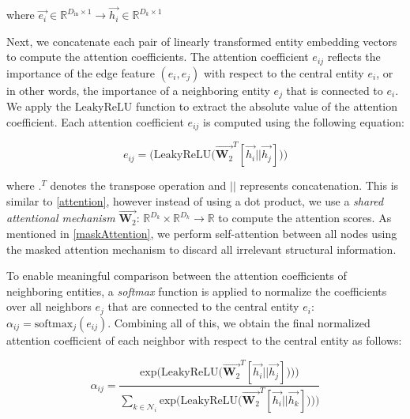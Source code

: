 where $\overrightarrow{e_i} \in \mathbb{R}^{D_{\text{in}} \times 1}
\xrightarrow{} \overrightarrow{h_i} \in \mathbb{R}^{D_k \times 1}$


Next, we concatenate each pair of linearly transformed entity embedding vectors to compute the attention coefficients. The attention coefficient $e_{ij}$ reflects the importance of the edge feature $(e_i, e_j)$ with respect to the central entity $e_i$, or in other words, the importance of a neighboring entity $e_j$ that is connected to $e_i$. We apply the $\text{LeakyReLU}$ function to extract the absolute value of the attention coefficient. Each attention coefficient $e_{ij}$ is computed using the following equation:

\begin{equation}
	e_{ij} = \Big( \text{LeakyReLU} \Big( \overrightarrow{\mathbf{W}_{2}}^{T} [\overrightarrow{h_i} || \overrightarrow{h_j}]\Big) \Big)
\end{equation}

where ${.}^{T}$ denotes the transpose operation and $||$ represents concatenation. This is similar to \ref{attention}, however instead of using a dot product, we use a \textit{shared attentional mechanism} $\overrightarrow{\mathbf{W}_2}$: $\mathbb{R}^{D_k} \times \mathbb{R}^{D_k} \rightarrow \mathbb{R}$ to compute the attention scores. As mentioned in \ref{maskAttention}, we perform self-attention between all nodes using the masked attention mechanism to discard all irrelevant structural information.

To enable meaningful comparison between the attention coefficients of neighboring entities, a \textit{softmax} function is applied to normalize the coefficients over all neighbors $e_j$ that are connected to the central entity $e_i$: $\alpha_{ij} = \text{softmax}_j(e_{ij})$. Combining all of this, we obtain the final normalized attention coefficient of each neighbor with respect to the central entity as follows:

\begin{equation}
	\label{attentionCoeff}
	\alpha_{ij} = \frac{
		\text{exp} \Big( \text{LeakyReLU} \Big( \overrightarrow{\mathbf{W}_2}^{T} [ \overrightarrow{h_i} || \overrightarrow{h_j}]\Big) \Big))
	}
	{
		\sum_{k \in \mathcal{N}_i}
		\text{exp} \Big( \text{LeakyReLU} \Big( \overrightarrow{\mathbf{W}_2}^{T} [\overrightarrow{h_i} || \overrightarrow{h_k}]\Big) \Big))
	}
\end{equation}





